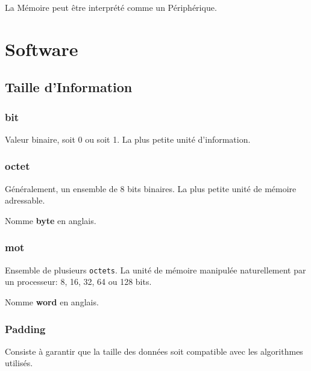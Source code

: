 \documentclass{article}
\begin{document}
\begin{definition}
    \begin{remark}
        La Mémoire peut être interprété comme un Périphérique.
    \end{remark}
\end{definition}



\section{Software}


\subsection{Taille d'Information}
\subsubsection{bit}
\begin{definition}\label{def:bit}
    Valeur binaire, soit 0 ou soit 1. La plus petite unité d'information.
\end{definition}

\subsubsection{octet}
\begin{definition}\label{def:octet}
    Généralement, un ensemble de 8 bits binaires. La plus petite unité de mémoire adressable.
    
    \begin{remark}
        Nomme \textbf{byte} en anglais.
    \end{remark}
\end{definition}

\subsubsection{mot}
\begin{definition}\label{def:mot}
    Ensemble de plusieurs \texttt{octets}. La unité de mémoire manipulée naturellement par un processeur: 8, 16, 32, 64 ou 128 bits.

    \begin{remark}
        Nomme \textbf{word} en anglais.
    \end{remark}
\end{definition}

\subsubsection{Padding}
\begin{definition}\label{def:padding}
    Consiste à garantir que la taille des données soit compatible avec les algorithmes utilisés.
\end{definition}
\end{document}
